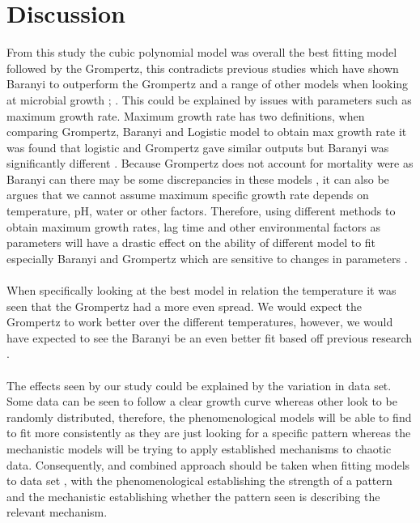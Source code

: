 \documentclass{article}
\begin{document}
	\section{Discussion}
	From this study the cubic polynomial model was overall the best fitting model followed by the Grompertz, this contradicts previous studies which have shown Baranyi to outperform the Grompertz and a range of other models when looking at microbial growth \autocite{XiongComparisonA} ; \autocite{Pla2015ComparisonMethods}. This could be explained by issues with parameters such as maximum growth rate. Maximum growth rate has two definitions, when comparing Grompertz, Baranyi and Logistic model to obtain max growth rate it was found that logistic and Grompertz gave similar outputs but Baranyi was significantly different \autocite{Perni2005EstimatingEverything}. Because Grompertz does not account for mortality were as Baranyi can there may be some discrepancies in these models \autocite{Micha2011MicrobialCannot}, it can also be argues that we cannot assume maximum specific growth rate depends on temperature, pH, water or other factors. Therefore, using different methods to obtain maximum growth rates, lag time and other environmental factors as parameters will have a drastic effect on the ability of different model to fit especially Baranyi and Grompertz which are sensitive to changes in parameters \autocite{XiongComparisonA}.
	\\
	\\
	When specifically looking at the best model in relation the temperature it was seen that the Grompertz had a more even spread. We would expect the Grompertz to work better over the different temperatures, however, we would have expected to see the Baranyi be an even better fit based off previous research \autocite{XiongComparisonA} \autocite{Lee2014ComparisonConditions}.
	\\
	\\
	The effects seen by our study could be explained by the variation in data set. Some data can be seen to follow a clear growth curve whereas other look to be randomly distributed, therefore, the phenomenological models will be able to find to fit more consistently as they are just looking for a specific pattern whereas the mechanistic models will be trying to apply established mechanisms to chaotic data. Consequently, and combined approach should be taken when fitting models to data set \autocite{Murtaugh2014InValues}, with the phenomenological establishing the strength of a pattern and the mechanistic establishing whether the pattern seen is describing the relevant mechanism.  
\end{document}
